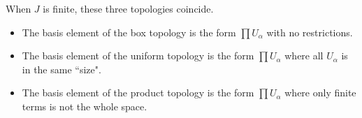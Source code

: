 \documentclass[12pt,a4paper]{article}
\begin{document}
    \begin{remark}
        When $J$ is finite, these three topologies coincide.
    \end{remark}
    \begin{remark}\hfill
    
        \begin{itemize}
            \item The basis element of the box topology is the form $\prod U_\alpha$ with no restrictions.
            \item The basis element of the uniform topology is the form $\prod U_\alpha$ where all $U_\alpha$ is in the same ``size".
            \item The basis element of the product topology is the form $\prod U_\alpha$ where only finite terms is not the whole space.
        \end{itemize}
    \end{remark}
    \hfill
\end{document}
